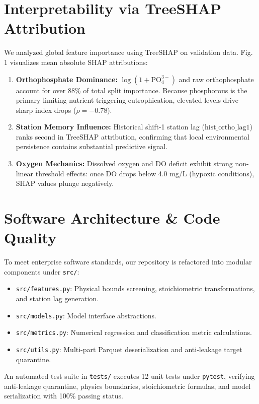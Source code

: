 \documentclass[conference]{IEEEtran}
\begin{document}
\section{Interpretability via TreeSHAP Attribution}
We analyzed global feature importance using TreeSHAP on validation data. Fig. 1 visualizes mean absolute SHAP attributions:
\begin{enumerate}
    \item \textbf{Orthophosphate Dominance:} $\log(1+\text{PO}_4^{3-})$ and raw orthophosphate account for over 88\% of total split importance. Because phosphorous is the primary limiting nutrient triggering eutrophication, elevated levels drive sharp index drops ($\rho = -0.78$).
    \item \textbf{Station Memory Influence:} Historical shift-1 station lag ($\text{hist\_ortho\_lag1}$) ranks second in TreeSHAP attribution, confirming that local environmental persistence contains substantial predictive signal.
    \item \textbf{Oxygen Mechanics:} Dissolved oxygen and DO deficit exhibit strong non-linear threshold effects: once DO drops below 4.0 mg/L (hypoxic conditions), SHAP values plunge negatively.
\end{enumerate}

\section{Software Architecture \& Code Quality}
To meet enterprise software standards, our repository is refactored into modular components under \texttt{src/}:
\begin{itemize}
    \item \texttt{src/features.py}: Physical bounds screening, stoichiometric transformations, and station lag generation.
    \item \texttt{src/models.py}: Model interface abstractions.
    \item \texttt{src/metrics.py}: Numerical regression and classification metric calculations.
    \item \texttt{src/utils.py}: Multi-part Parquet deserialization and anti-leakage target quarantine.
\end{itemize}

An automated test suite in \texttt{tests/} executes 12 unit tests under \texttt{pytest}, verifying anti-leakage quarantine, physics boundaries, stoichiometric formulas, and model serialization with 100\% passing status.
\end{document}
